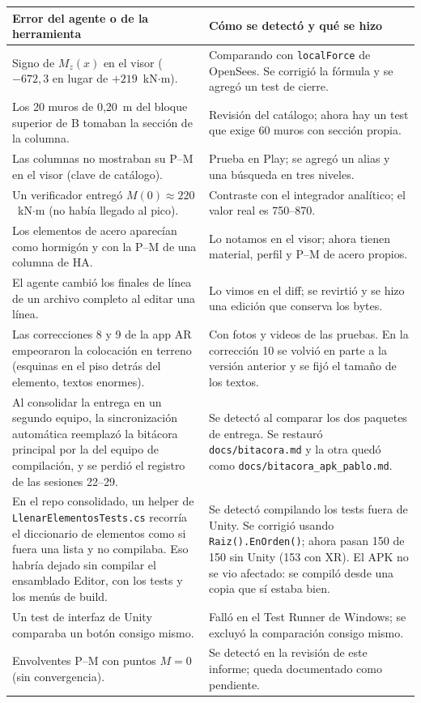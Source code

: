 \documentclass[11pt,a4paper]{article}
\begin{document}
\begin{longtable}{p{}p{}}
\toprule
Error del agente o de la herramienta & Cómo se detectó y qué se hizo \\
\midrule
\endhead
Signo de $M_z(x)$ en el visor ($-672{,}3$ en lugar de $+219$~kN$\cdot$m). &
Comparando con \texttt{localForce} de OpenSees. Se corrigió la fórmula y se
agregó un test de cierre. \\
Los 20 muros de 0,20~m del bloque superior de B tomaban la sección de la columna. &
Revisión del catálogo; ahora hay un test que exige 60 muros con sección propia. \\
Las columnas no mostraban su P--M en el visor (clave de catálogo). &
Prueba en Play; se agregó un alias y una búsqueda en tres niveles. \\
Un verificador entregó $M(0) \approx 220$~kN$\cdot$m (no había llegado al pico). &
Contraste con el integrador analítico; el valor real es 750--870. \\
Los elementos de acero aparecían como hormigón y con la P--M de una columna de HA. &
Lo notamos en el visor; ahora tienen material, perfil y P--M de acero propios. \\
El agente cambió los finales de línea de un archivo completo al editar una línea. &
Lo vimos en el diff; se revirtió y se hizo una edición que conserva los bytes. \\
Las correcciones 8 y 9 de la app AR empeoraron la colocación en terreno (esquinas en el piso detrás del elemento, textos enormes). &
Con fotos y videos de las pruebas. En la corrección 10 se volvió en parte a la versión anterior y se fijó el tamaño de los textos. \\
Al consolidar la entrega en un segundo equipo, la sincronización automática
reemplazó la bitácora principal por la del equipo de compilación, y se perdió el
registro de las sesiones 22--29. &
Se detectó al comparar los dos paquetes de entrega. Se restauró
\texttt{docs/bitacora.md} y la otra quedó como
\texttt{docs/bitacora\_apk\_pablo.md}. \\
En el repo consolidado, un helper de \texttt{LlenarElementosTests.cs} recorría
el diccionario de elementos como si fuera una lista y no compilaba. Eso habría
dejado sin compilar el ensamblado Editor, con los tests y los menús de build. &
Se detectó compilando los tests fuera de Unity. Se corrigió usando
\texttt{Raiz().EnOrden()}; ahora pasan 150 de 150 sin Unity (153 con XR). El
APK no se vio afectado: se compiló desde una copia que sí estaba bien. \\
Un test de interfaz de Unity comparaba un botón consigo mismo. &
Falló en el Test Runner de Windows; se excluyó la comparación consigo mismo. \\
Envolventes P--M con puntos $M = 0$ (sin convergencia). &
Se detectó en la revisión de este informe; queda documentado como pendiente. \\
\bottomrule
\end{longtable}
\end{document}
